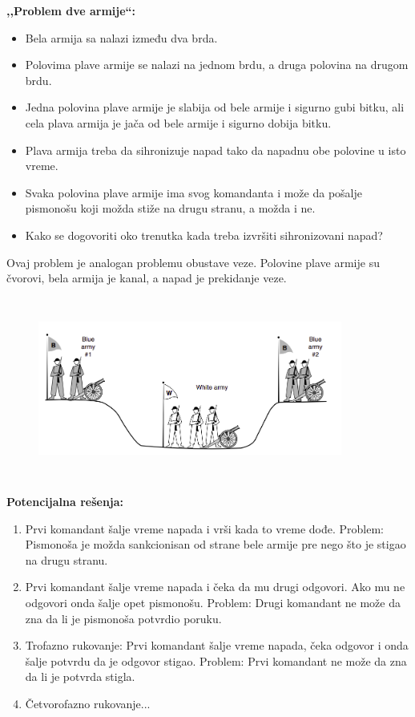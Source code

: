 \documentclass[a4paper]{article}
\begin{document}
        \textbf{,,Problem dve armije``:} 
        \begin{itemize}
            \item Bela armija sa nalazi između dva brda.
            \item Polovima plave armije se nalazi na jednom brdu, a druga polovina na drugom brdu.
            \item Jedna polovina plave armije je slabija od bele armije i sigurno gubi bitku, 
                  ali cela plava armija je jača od bele armije i sigurno dobija bitku. 
            \item Plava armija treba da sihronizuje napad tako da napadnu obe polovine u isto vreme.
            \item Svaka polovina plave armije ima svog komandanta i može
                  da pošalje pismonošu koji možda stiže na drugu stranu, a možda i ne.
            \item Kako se dogovoriti oko trenutka kada treba izvršiti sihronizovani napad?
        \end{itemize} 
        \indent Ovaj problem je analogan problemu obustave veze. Polovine plave armije su čvorovi, 
        bela armija je kanal, a napad je prekidanje veze. 
        \begin{figure}[H]
            \begin{center}
                \includegraphics[width=100mm,height=60mm]{Slike/armije.png}
            \end{center}
        \end{figure}
        \noindent \textbf{Potencijalna rešenja:}
        \begin{enumerate}
            \item Prvi komandant šalje vreme napada i vrši kada to vreme dođe. Problem:
                  Pismonoša je možda sankcionisan od strane bele armije pre nego što je stigao
                  na drugu stranu.
            \item Prvi komandant šalje vreme napada i čeka da mu drugi odgovori. Ako mu ne
                  odgovori onda šalje opet pismonošu. Problem: Drugi komandant ne može
                  da zna da li je pismonoša potvrdio poruku.
            \item Trofazno rukovanje: Prvi komandant šalje vreme napada, čeka odgovor i onda
                  šalje potvrdu da je odgovor stigao. Problem: Prvi komandant ne može da zna
                  da li je potvrda stigla.
            \item Četvorofazno rukovanje...
        \end{enumerate}
\end{document}
